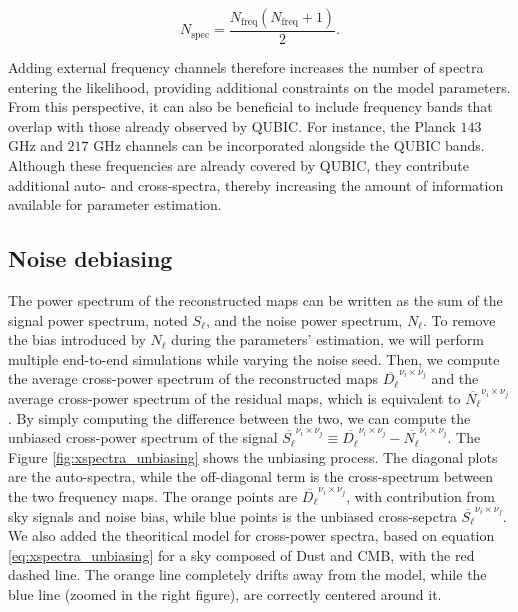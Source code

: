 \documentclass[../../thesis.tex]{subfiles}
\begin{document}
\[
N_{\mathrm{spec}} = \frac{N_{\mathrm{freq}}\left(N_{\mathrm{freq}}+1\right)}{2}.
\]

Adding external frequency channels therefore increases the number of spectra entering the likelihood, providing additional constraints on the model parameters. From this perspective, it can also be beneficial to include frequency bands that overlap with those already observed by QUBIC. For instance, the Planck $143$ GHz and $217$ GHz channels can be incorporated alongside the QUBIC bands. Although these frequencies are already covered by QUBIC, they contribute additional auto- and cross-spectra, thereby increasing the amount of information available for parameter estimation.

\subsection{Noise debiasing}

The power spectrum of the reconstructed maps can be written as the sum of the signal power spectrum, noted $S_\ell$, and the noise power spectrum, $N_\ell$. To remove the bias introduced by $N_\ell$ during the parameters' estimation, we will perform multiple end-to-end simulations while varying the noise seed. 
Then, we compute the average cross-power spectrum of the reconstructed maps $\overline{D_\ell}^{\nu_i \times \nu_j}$ and the average cross-power spectrum of the residual maps, which is equivalent to $\overline{N_\ell}^{\nu_i \times \nu_j}$. By simply computing the difference between the two, we can compute the unbiased cross-power spectrum of the signal $\overline{S_\ell}^{\nu_i \times \nu_j} \equiv \overline{D_\ell}^{\nu_i \times \nu_j} - \overline{N_\ell}^{\nu_i \times \nu_j}$. The Figure \ref{fig:xspectra_unbiasing} shows the unbiasing process. The diagonal plots are the auto-spectra, while the off-diagonal term is the cross-spectrum between the two frequency maps. The orange points are $\overline{D_\ell}^{\nu_i \times \nu_j}$, with contribution from sky signals and noise bias, while blue points is the unbiased cross-sepctra $\overline{S_\ell}^{\nu_i \times \nu_j}$. We also added the theoritical model for cross-power spectra, based on equation \ref{eq:xspectra_unbiasing} for a sky composed of Dust and CMB, with the red dashed line. The orange line completely drifts away from the model, while the blue line (zoomed in the right figure), are correctly centered around it. 
\end{document}
